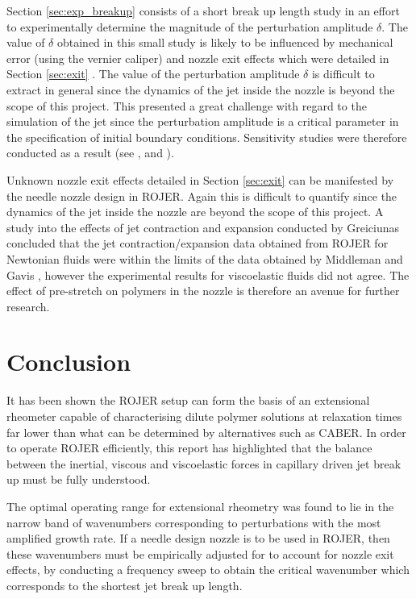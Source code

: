 \documentclass[11pt]{article}
\begin{document}
Section \ref{sec:exp_breakup} consists of a short break up length study in an effort to experimentally determine the magnitude of the perturbation amplitude $\delta$. The value of $\delta$ obtained in this small study is likely to be influenced by mechanical error (using the vernier caliper) and nozzle exit effects which were detailed in Section \ref{sec:exit} . The value of the perturbation amplitude $\delta$ is difficult to extract in general since the dynamics of the jet inside the nozzle is beyond the scope of this project. This presented a great challenge with regard to the simulation of the jet since the perturbation amplitude is a critical parameter in the specification of initial boundary conditions. Sensitivity studies were therefore conducted as a result (see \cite{gorbatenko2015report}, \cite{greiciunas2015report} and \cite{hall2015report}).

Unknown nozzle exit effects detailed in Section \ref{sec:exit} can  be manifested by the needle nozzle design in ROJER. Again this is difficult to quantify since the dynamics of the jet inside the nozzle are beyond the scope of this project. A study into the effects of jet contraction and expansion conducted by Greiciunas \cite{greiciunas2015report} concluded that the jet contraction/expansion data obtained from ROJER for Newtonian fluids were within the limits of the data obtained by Middleman and Gavis \cite{middleman1961expansion}, however the experimental results for viscoelastic fluids did not agree. The effect of pre-stretch on polymers in the nozzle is therefore an avenue for further research. 

\newpage

\section{Conclusion}

It has been shown the ROJER setup can form the basis of an extensional rheometer capable of characterising dilute polymer solutions at relaxation times far lower than what can be determined by alternatives such as CABER. In order to operate ROJER efficiently, this report has highlighted that the balance between the inertial, viscous and viscoelastic forces in capillary driven jet break up must be fully understood.

The optimal operating range for extensional rheometry was found to lie in the narrow band of wavenumbers corresponding to perturbations with the most amplified growth rate. If a needle design nozzle is to be used in ROJER, then these wavenumbers must be empirically adjusted for to account for nozzle exit effects, by conducting a frequency sweep to obtain the critical wavenumber which corresponds to the shortest jet break up length.
\end{document}
